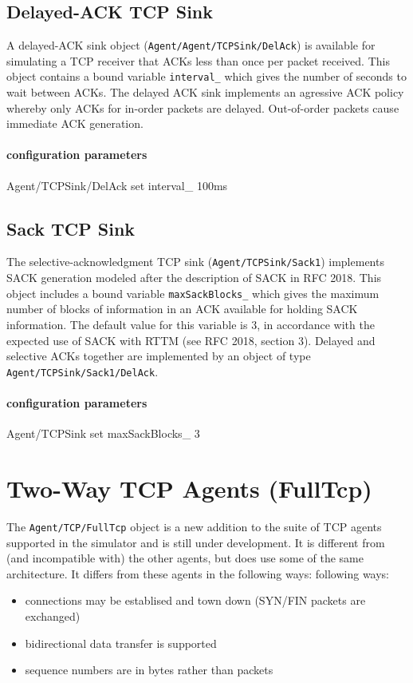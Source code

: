 \subsection{Delayed-ACK TCP Sink}

A delayed-ACK sink object ({\tt Agent/Agent/TCPSink/DelAck}) is available
for simulating a TCP receiver that ACKs less than once per packet received.
This object contains a bound variable {\tt interval\_} which gives the
number of seconds to wait between ACKs.
The delayed ACK sink implements an agressive ACK policy whereby
only ACKs for in-order packets are delayed.
Out-of-order packets cause immediate ACK generation.

\paragraph{configuration parameters}
\begin{program}
        Agent/TCPSink/DelAck set interval_ 100ms
\end{program}

\subsection{Sack TCP Sink}

The selective-acknowledgment TCP sink ({\tt Agent/TCPSink/Sack1}) implements
SACK generation modeled after the description of SACK in RFC 2018.
This object includes a bound variable {\tt maxSackBlocks\_} which gives
the maximum number of blocks of information in an ACK available for
holding SACK information.
The default value for this variable is 3, in accordance with the expected
use of SACK with RTTM (see RFC 2018, section 3).
Delayed and selective ACKs together are implemented by
an object of type {\tt Agent/TCPSink/Sack1/DelAck}.

\paragraph{configuration parameters}
\begin{program}
        Agent/TCPSink set maxSackBlocks_ 3
\end{program}

\section{Two-Way TCP Agents (FullTcp)}
\label{sec:fulltcp}

The {\tt Agent/TCP/FullTcp} object is a new addition to the suite of
TCP agents supported in the simulator and is still under development.
It is different from (and incompatible with) the other agents, but
does use some of the same architecture.
It differs from these agents in the following ways:
following ways:
\begin{itemize}\itemsep0pt
\item connections may be establised and town down
(SYN/FIN packets are exchanged)
\item bidirectional data transfer is supported
\item sequence numbers are in bytes rather than packets
\end{itemize}

